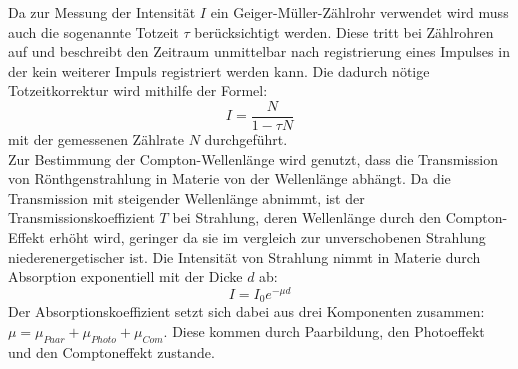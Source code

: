 Da zur Messung der Intensität $I$ ein Geiger-Müller-Zählrohr verwendet wird muss auch die sogenannte Totzeit $\tau$ berücksichtigt werden. Diese tritt bei Zählrohren auf und beschreibt den Zeitraum unmittelbar nach registrierung eines Impulses in der kein weiterer Impuls registriert werden kann. Die dadurch nötige Totzeitkorrektur wird mithilfe der Formel:
\begin{equation}
I=\frac{N}{1-\tau N}
\end{equation}  
mit der gemessenen Zählrate $N$ durchgeführt. \\
Zur Bestimmung der Compton-Wellenlänge wird genutzt, dass die Transmission von Rönthgenstrahlung in Materie von der Wellenlänge abhängt. Da die Transmission mit steigender Wellenlänge abnimmt, ist der Transmissionskoeffizient $T$  bei Strahlung, deren Wellenlänge durch den Compton-Effekt erhöht wird, geringer da sie im vergleich zur unverschobenen Strahlung niederenergetischer ist. Die Intensität von Strahlung nimmt in Materie durch Absorption exponentiell mit der Dicke $d$ ab:
\begin{equation}
I=I_0e^{-\mu d}    
\end{equation}
Der Absorptionskoeffizient setzt sich dabei aus drei Komponenten zusammen: $\mu=\mu_{Paar}+\mu_{Photo}+\mu_{Com}$. Diese kommen durch Paarbildung, den Photoeffekt und den Comptoneffekt zustande.

